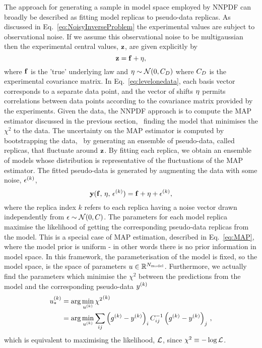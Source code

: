 The approach for generating a sample in model space employed by NNPDF can
broadly be described as fitting model replicas to pseudo-data replicas. As
discussed in Eq.~\eqref{eq:NoisyInverseProblem} the experimental values are
subject to observational noise. If we assume this observational noise to be
multigaussian then the experimental central values, $\mathbf{z}$, are given
explicitly by
\begin{equation}
    \label{eq:levelonedata}
    \mathbf{z} = \mathbf{f} + \mathbf{\eta},
\end{equation}
where $\mathbf{f}$ is the 'true' underlying law and $\mathbf{\eta} \sim
\mathcal{N}(0, C_D)$ where $C_D$ is the experimental covariance matrix. In
Eq.~\eqref{eq:levelonedata}, each basis vector corresponds to a separate data
point, and the vector of shifts $\mathbf{\eta}$ permits correlations between data
points according to the covariance matrix provided by the experiments. Given the
data, the NNPDF approach is to compute the MAP estimator discussed in the
previous section, \ie\ finding the model that minimises the $\chi^2$ to the
data. The uncertainty on the MAP estimator is computed by bootstrapping the
data, \ie\ by generating an ensemble of pseudo-data, called replicas, that
fluctuate around $\mathbf{z}$. By fitting each replica, we obtain an ensemble
of models whose distribution is representative of the fluctuations of the MAP
estimator. The fitted pseudo-data is generated by augmenting the data with some
noise, $\epsilon^{(k)}$,
\begin{equation}
    \label{eq:leveltwodata1}
    \mathbf{y}(\mathbf{f},\,\mathbf{\eta},\,\mathbf{\epsilon}^{(k)})
    = \mathbf{f} + \mathbf{\eta} + \mathbf{\epsilon}^{(k)},
\end{equation}
where the replica index $k$ refers to each replica having a noise vector drawn
independently from $\mathbf{\epsilon} \sim \mathcal{N}(0, C)$. The parameters for
each model replica maximise the likelihood of getting the corresponding
pseudo-data replicas from the model. This is a special case of MAP estimation,
described in Eq.~\eqref{eq:MAP}, where the model prior is uniform - in other
words there is no prior information in model space. In this framework, the
parameterisation of the model is fixed, so the model space, is the space of
parameters $u \in \mathbb{R}^{N_{\rm model}}$. Furthermore, we actually find the
parameters which minimise the $\chi^2$ between the predictions from the model
and the corresponding pseudo-data $y^{(k)}$
\begin{equation}
    \begin{split}
        u^{(k)}_* &= \arg\min_{u^{(k)}} {\chi^2}^{(k)} \\
        &= \arg\min_{u^{(k)}} \sum_{ij} \left( g^{(k)} - y^{(k)} \right)_i C^{-1}_{ij} \left( g^{(k)} - y^{(k)} \right)_j\, ,
    \end{split}
\end{equation}
which is equivalent to maximising the likelihood, $\mathcal{L}$, since
$\chi^2 \equiv -\log{\mathcal{L}}$.

